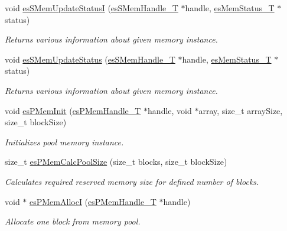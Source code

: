 \begin{DoxyCompactItemize}
void \hyperlink{group__mem__impl_ga87b817ce71357521c4cd43a9cb587201}{es\-S\-Mem\-Update\-Status\-I} (\hyperlink{group__mem__intf_gabf19a317cc22713cfb45ae1e43d34d7e}{es\-S\-Mem\-Handle\-\_\-\-T} $\ast$handle, \hyperlink{group__mem__intf_ga0eb568b68247d93e2db804a681de0e9e}{es\-Mem\-Status\-\_\-\-T} $\ast$status)
\begin{DoxyCompactList}\small\item\em Returns various information about given memory instance. \end{DoxyCompactList}\item 
void \hyperlink{group__mem__impl_gac0ad18ef5c9332358a4d0a5ded270f34}{es\-S\-Mem\-Update\-Status} (\hyperlink{group__mem__intf_gabf19a317cc22713cfb45ae1e43d34d7e}{es\-S\-Mem\-Handle\-\_\-\-T} $\ast$handle, \hyperlink{group__mem__intf_ga0eb568b68247d93e2db804a681de0e9e}{es\-Mem\-Status\-\_\-\-T} $\ast$status)
\begin{DoxyCompactList}\small\item\em Returns various information about given memory instance. \end{DoxyCompactList}\item 
void \hyperlink{group__mem__impl_ga0cf65ff195adf771ccc1fa12d61dc74a}{es\-P\-Mem\-Init} (\hyperlink{group__mem__intf_gaf82f01d26c4f6bc9a2b672a673b09ce2}{es\-P\-Mem\-Handle\-\_\-\-T} $\ast$handle, void $\ast$array, size\-\_\-t array\-Size, size\-\_\-t block\-Size)
\begin{DoxyCompactList}\small\item\em Initializes pool memory instance. \end{DoxyCompactList}\item 
size\-\_\-t \hyperlink{group__mem__impl_gab82743b6c82847c748bf5193f0f211ec}{es\-P\-Mem\-Calc\-Pool\-Size} (size\-\_\-t blocks, size\-\_\-t block\-Size)
\begin{DoxyCompactList}\small\item\em Calculates required reserved memory size for defined number of blocks. \end{DoxyCompactList}\item 
void $\ast$ \hyperlink{group__mem__impl_gabdacce602565fcd6a186c2834cb74488}{es\-P\-Mem\-Alloc\-I} (\hyperlink{group__mem__intf_gaf82f01d26c4f6bc9a2b672a673b09ce2}{es\-P\-Mem\-Handle\-\_\-\-T} $\ast$handle)
\begin{DoxyCompactList}\small\item\em Allocate one block from memory pool. \end{DoxyCompactList}\item 

\end{DoxyCompactItemize}
